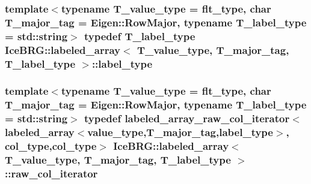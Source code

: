 \subsubsection[{label\+\_\+type}]{\setlength{\rightskip}{0pt plus 5cm}template$<$typename T\+\_\+value\+\_\+type = flt\+\_\+type, char T\+\_\+major\+\_\+tag = Eigen\+::\+Row\+Major, typename T\+\_\+label\+\_\+type = std\+::string$>$ typedef T\+\_\+label\+\_\+type {\bf Ice\+B\+R\+G\+::labeled\+\_\+array}$<$ T\+\_\+value\+\_\+type, T\+\_\+major\+\_\+tag, T\+\_\+label\+\_\+type $>$\+::{\bf label\+\_\+type}}\label{classIceBRG_1_1labeled__array_a6355a8e274be241162cfe4717bcd907f}
\hypertarget{classIceBRG_1_1labeled__array_a61c797b83845ec6cc53d2ecb73899ad1}{}
\subsubsection[{raw\+\_\+col\+\_\+iterator}]{\setlength{\rightskip}{0pt plus 5cm}template$<$typename T\+\_\+value\+\_\+type = flt\+\_\+type, char T\+\_\+major\+\_\+tag = Eigen\+::\+Row\+Major, typename T\+\_\+label\+\_\+type = std\+::string$>$ typedef {\bf labeled\+\_\+array\+\_\+raw\+\_\+col\+\_\+iterator}$<${\bf labeled\+\_\+array}$<${\bf value\+\_\+type},T\+\_\+major\+\_\+tag,{\bf label\+\_\+type}$>$, {\bf col\+\_\+type},{\bf col\+\_\+type}$>$ {\bf Ice\+B\+R\+G\+::labeled\+\_\+array}$<$ T\+\_\+value\+\_\+type, T\+\_\+major\+\_\+tag, T\+\_\+label\+\_\+type $>$\+::{\bf raw\+\_\+col\+\_\+iterator}}\label{classIceBRG_1_1labeled__array_a61c797b83845ec6cc53d2ecb73899ad1}
\hypertarget{classIceBRG_1_1labeled__array_a5135379d418bba0a185e5c26a9774f78}{}
